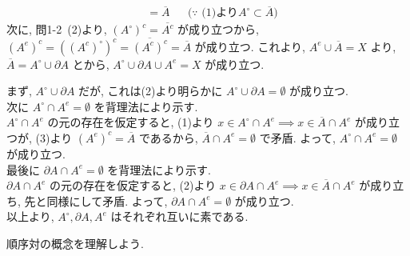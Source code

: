 \documentclass[dvipdfmx,a4j]{jarticle}
\newcounter{pn}     %
\let\np\newpage
\renewcommand{\newpage}{
    \np
    \addtocounter{pn}{1}
}
\begin{document}
{\begin{align*}
                            &= \overline{A}&&\text{($\because$ (1)より$A^\circ \subset \overline{A}$)} 
\end{align*}
次に, 問1-2\ (2)より, $(A^\circ)^c = \overline{A^c}$ が成り立つから, $(A^e)^c = ((A^c)^\circ)^c = \overline{(A^c)^c} = \overline{A}$ が成り立つ. これより, $A^e \cup \overline{A} = X$ より, 
$\overline{A} = A^\circ \cup \partial A$ とから, $A^\circ \cup \partial A \cup A^e = X$ が成り立つ.
\item
まず, $A^\circ \cup \partial A$ だが, これは(2)より明らかに $A^\circ \cup \partial A = \emptyset$ が成り立つ.\\
次に $A^\circ \cap A^e = \emptyset$ を背理法により示す.\\
$A^\circ \cap A^e$ の元の存在を仮定すると, (1)より $x \in A^\circ \cap A^e \implies x \in \overline{A} \cap A^e$ が成り立つが, (3)より $(A^e)^c = \overline{A}$ であるから, $\overline{A} \cap A^e = \emptyset$
で矛盾. よって, $A^\circ \cap A^e = \emptyset$ が成り立つ.\\
最後に $\partial A \cap A^e = \emptyset$ を背理法により示す.\\
$\partial A \cap A^e$ の元の存在を仮定すると, (2)より $x \in \partial A \cap A^e \implies x \in \overline{A} \cap A^e$ が成り立ち, 先と同様にして矛盾. よって, $\partial A \cap A^e = \emptyset$ が成り立つ.\\
以上より, $A^\circ, \partial A, A^e$ はそれぞれ互いに素である.
}

\newpage
順序対の概念を理解しよう.\\
\end{document}
